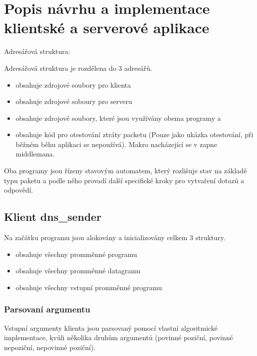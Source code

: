 


\section{Popis návrhu a implementace klientské a serverové aplikace}
\label{sec:popis-navrhu-a-implementace-klientske-a-serverove-aplikace}
Adresářová struktura:

Adresářová struktura je rozdělena do 3 adresářů.

\begin{itemize}
    \item {} \- obsahuje zdrojové soubory pro klienta
    \item {} \- obsahuje zdrojové soboury pro serveru
    \item {} \- obsahuje zdrojové soubory, které jsou využívány
    obema programy  a 
    \item {} \- obsahuje kód pro otestování ztráty
    packetu (Pouze jako ukázka otestování, při běžném běhu aplikaci se nepoužívá).
    Makro  nacházející se v
     zapne middlemana.
\end{itemize}

Oba programy jsou řízeny stavovým automatem, který rozlišuje stav
na základě typu paketu a podle
něho provadí další specifické kroky pro vytvaření dotazů a odpovědí.



\subsection{Klient \- dns\_sender}
Na začátku programu jsou alokovány a inicializovány celkem 3 struktury.
\begin{itemize}
    \item {} \- obsahuje všechny promměnné programu
    \item {} \- obsahuje všechny promměnné datagramu
    \item {} \- obsahuje všechny vstupní promměnné programu
\end{itemize}

\subsubsection{Parsovaní argumentu} \label{sec:parsovani-argumentu-k}
Vstupní argumenty klienta jsou parsovaný pomocí vlastní algoritmické
implementace, kvůli několika druhům argumentů
(povinné poziční, povinné nepoziční, nepovinné poziční).

